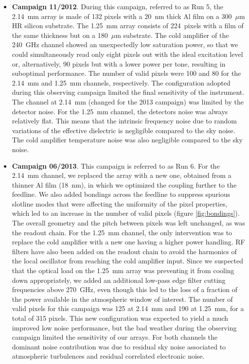 \begin{itemize}
\item{\textbf{Campaign 11/2012}. During this campaign, referred to as Run 5,
    the 2.14~mm array is made of 132 pixels with a 20~nm thick Al film on a
    300~$\mu$m HR silicon substrate. The 1.25~mm array consists of 224~pixels
    with a film of the same thickness but on a 180~$\mu$m substrate. The cold
    amplifier of the 240~GHz channel showed an unexpectedly low saturation
    power, so that we could simultaneously read only eight pixels out with the
    ideal excitation level or, alternatively, 90 pixels but with a lower power
    per tone, resulting in suboptimal performance.  The number of valid
    pixels were 100 and 80 for the 2.14~mm and 1.25~mm channels, respectively.
    The configuration adopted during this observing campaign limited the final sensitivity of the instrument. 
    The channel at 2.14~mm (changed for the 2013 campaign) was limited by the detector noise. For the 1.25~mm channel, 
    the detectors noise was always relatively flat. This means that the intrinsic frequency noise 
    due to random variations of the effective dielectric is negligible compared to the sky noise. 
    The cold amplifier temperature noise was also negligible compared to the sky noise.}
\item{\textbf{Campaign 06/2013}. This campaign is referred to as Run 6. For
    the 2.14~mm channel, we replaced the array with a new one, obtained from a
    thinner Al film (18~nm), in which we optimized the coupling further to the
    feedline. We also added bondings across the feedline to suppress spurious
    slotline modes that were affecting the uniformity of the pixel properties,
    which led to an increase in the number of valid pixels (figure
    \ref{fig:bondings}). The overall geometry and the pitch between pixels
    was left unchanged, as was the readout chain. For the 1.25~mm channel, the
    only intervention was to replace the cold amplifier with a new one
    having a higher power handling. RF filters have also been added on the
    readout chain to avoid the harmonics of the local oscillator from
    reaching the cold amplifier input. Since we suspected that the optical
    load on the 1.25~mm array was preventing it from cooling down
    appropriately, we added an additional low-pass edge filter cutting
    frequencies above 270~GHz, even though this led to the loss of a fraction %
    of the power available in the atmospheric window of
    interest. The number of valid pixels for this campaign was 125 at 2.14~mm
    and 190 at 1.25~mm, for a total of 315 pixels.
   This new configuration was expected to yield a much improved low noise performance, but the bad weather 
   during the observing campaign limited the sensitivity of our arrays. For both channels the dominant noise contribution was due to residual sky noise associated to atmospheric turbulences and residual correlated electronic noise.}
\end{itemize}




